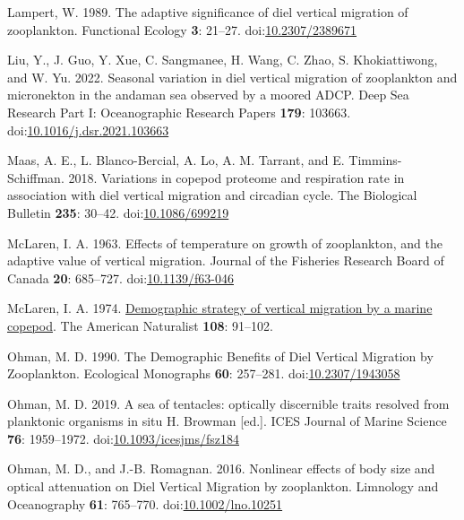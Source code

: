 \documentclass[
]{article}
\newlength{\cslhangindent}
\newlength{\cslentryspacingunit} %
\newenvironment{CSLReferences}[2] %
 {%
  \setlength{\parindent}{0pt}
  \ifodd #1
  \let\oldpar\par
  \def\par{\hangindent=\cslhangindent\oldpar}
  \fi
  \setlength{\parskip}{#2\cslentryspacingunit}
 }%
 {}
\begin{document}
\begin{CSLReferences}{1}{0}
\leavevmode{}%
Lampert, W. 1989. The adaptive significance of diel vertical migration
of zooplankton. Functional Ecology \textbf{3}: 21--27.
doi:\href{https://doi.org/10.2307/2389671}{10.2307/2389671}

\leavevmode{}%
Liu, Y., J. Guo, Y. Xue, C. Sangmanee, H. Wang, C. Zhao, S.
Khokiattiwong, and W. Yu. 2022. Seasonal variation in diel vertical
migration of zooplankton and micronekton in the andaman sea observed by
a moored ADCP. Deep Sea Research Part I: Oceanographic Research Papers
\textbf{179}: 103663.
doi:\href{https://doi.org/10.1016/j.dsr.2021.103663}{10.1016/j.dsr.2021.103663}

\leavevmode{}%
Maas, A. E., L. Blanco-Bercial, A. Lo, A. M. Tarrant, and E.
Timmins-Schiffman. 2018. Variations in copepod proteome and respiration
rate in association with diel vertical migration and circadian cycle.
The Biological Bulletin \textbf{235}: 30--42.
doi:\href{https://doi.org/10.1086/699219}{10.1086/699219}

\leavevmode{}%
McLaren, I. A. 1963. Effects of temperature on growth of zooplankton,
and the adaptive value of vertical migration. Journal of the Fisheries
Research Board of Canada \textbf{20}: 685--727.
doi:\href{https://doi.org/10.1139/f63-046}{10.1139/f63-046}

\leavevmode{}%
McLaren, I. A. 1974.
\href{https://www.jstor.org/stable/2459738}{Demographic strategy of
vertical migration by a marine copepod}. The American Naturalist
\textbf{108}: 91--102.

\leavevmode{}%
Ohman, M. D. 1990. The Demographic Benefits of Diel Vertical Migration
by Zooplankton. Ecological Monographs \textbf{60}: 257--281.
doi:\href{https://doi.org/10.2307/1943058}{10.2307/1943058}

\leavevmode{}%
Ohman, M. D. 2019. A sea of tentacles: optically discernible traits
resolved from planktonic organisms in situ H. Browman {[}ed.{]}. ICES
Journal of Marine Science \textbf{76}: 1959--1972.
doi:\href{https://doi.org/10.1093/icesjms/fsz184}{10.1093/icesjms/fsz184}

\leavevmode{}%
Ohman, M. D., and J.-B. Romagnan. 2016. Nonlinear effects of body size
and optical attenuation on Diel Vertical Migration by zooplankton.
Limnology and Oceanography \textbf{61}: 765--770.
doi:\href{https://doi.org/10.1002/lno.10251}{10.1002/lno.10251}


\end{CSLReferences}
\end{document}
